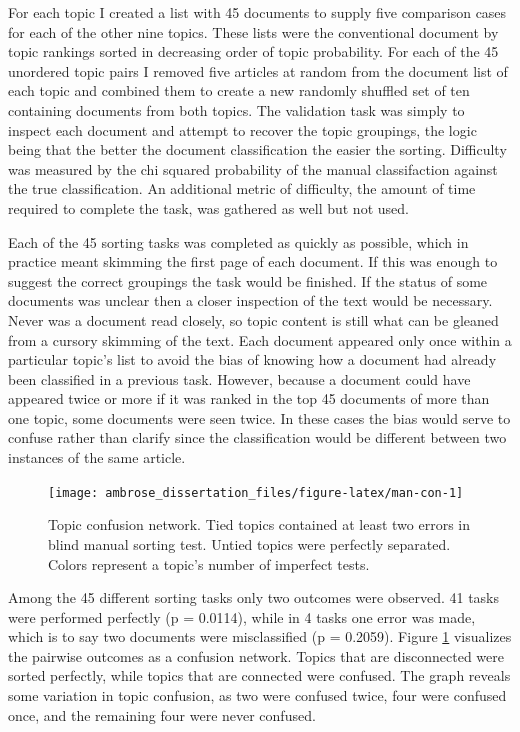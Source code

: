 \documentclass[]{book}
\theoremstyle{definition}
\theoremstyle{definition}
\theoremstyle{definition}
\theoremstyle{remark}
\begin{document}
For each topic I created a list with 45 documents to supply five
comparison cases for each of the other nine topics. These lists were the
conventional document by topic rankings sorted in decreasing order of
topic probability. For each of the 45 unordered topic pairs I removed
five articles at random from the document list of each topic and
combined them to create a new randomly shuffled set of ten containing
documents from both topics. The validation task was simply to inspect
each document and attempt to recover the topic groupings, the logic
being that the better the document classification the easier the
sorting. Difficulty was measured by the chi squared probability of the
manual classifaction against the true classification. An additional
metric of difficulty, the amount of time required to complete the task,
was gathered as well but not used.

Each of the 45 sorting tasks was completed as quickly as possible, which
in practice meant skimming the first page of each document. If this was
enough to suggest the correct groupings the task would be finished. If
the status of some documents was unclear then a closer inspection of the
text would be necessary. Never was a document read closely, so topic
content is still what can be gleaned from a cursory skimming of the
text. Each document appeared only once within a particular topic's list
to avoid the bias of knowing how a document had already been classified
in a previous task. However, because a document could have appeared
twice or more if it was ranked in the top 45 documents of more than one
topic, some documents were seen twice. In these cases the bias would
serve to confuse rather than clarify since the classification would be
different between two instances of the same article.

\begin{figure}

{\centering \texttt{[image: ambrose\_dissertation\_files/figure-latex/man-con-1]} 

}

\caption{Topic confusion network. Tied topics contained at least two errors in blind manual sorting test. Untied topics were perfectly separated. Colors represent a topic's number of imperfect tests.}\label{fig:man-con}
\end{figure}

Among the 45 different sorting tasks only two outcomes were observed. 41
tasks were performed perfectly (p = 0.0114), while in 4 tasks one error
was made, which is to say two documents were misclassified (p = 0.2059).
Figure \ref{fig:man-con} visualizes the pairwise outcomes as a confusion
network. Topics that are disconnected were sorted perfectly, while
topics that are connected were confused. The graph reveals some
variation in topic confusion, as two were confused twice, four were
confused once, and the remaining four were never confused.
\end{document}
